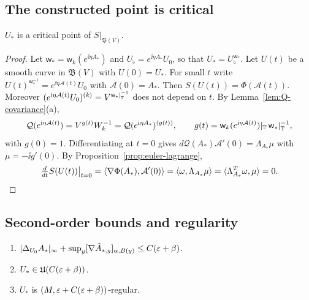 \subsection{The constructed point is critical}

\begin{proposition}\label{prop:critical}
$U_*$ is a critical point of $S|_{\mathfrak B(V)}$.
\end{proposition}

\begin{proof}
Let $\mathsf w_*=\mathsf w_k(e^{\ii\eta A_*})$ and $U_\flat=e^{\ii\eta A_*}U_0$, so that $U_*=U_\flat^{\mathsf w_*}$. Let $U(t)$ be a smooth curve in $\mathfrak B(V)$ with $U(0)=U_*$. For small $t$ write $U(t)^{\mathsf w_*^{-1}}=e^{\ii\eta\mathcal A(t)}U_0$ with $\mathcal A(0)=A_*$. Then $S(U(t))=\Phi(\mathcal A(t))$. Moreover $(e^{\mathrm i\eta\mathcal A(t)}U_0)^{(k)}=V^{\mathsf w_*|_\mathbb T^{-1}}$ does not depend on $t$. By Lemma~\ref{lem:Q-covariance}(a),
\[
\mathcal Q(e^{\mathrm i\eta\mathcal A(t)})=V^{g(t)}W_k^{-1}=\mathcal Q(e^{\mathrm i\eta A_*})^{(g(t))},\qquad g(t)=\mathsf w_k(e^{\mathrm i\eta\mathcal A(t)})|_\mathbb T\,\mathsf w_*|_\mathbb T^{-1},
\]
with $g(0)=1$. Differentiating at $t=0$ gives $d\mathcal Q(A_*)\mathcal A'(0)=\Lambda_{A_*}\mu$ with $\mu=-\ii g'(0)$. By Proposition~\ref{prop:euler-lagrange},
\[
\tfrac{d}{dt}S(U(t))\big|_{t=0}=\langle \nabla\Phi(A_*),\mathcal A'(0)\rangle=\langle \omega,\Lambda_{A_*}\mu\rangle=\langle \Lambda_{A_*}^T\omega,\mu\rangle=0.\qedhere
\]
\end{proof}

\subsection{Second-order bounds and regularity}

\begin{proposition}\label{prop:minimizer-regularity}
\begin{enumerate}[label=(\alph*)]
\item $|\Delta_{U_0}A_*|_\infty+\sup_y[\nabla\tilde A_{*,y}]_{\alpha,B(y)}\le C(\varepsilon+\beta)$.
\item $U_*\in\mathfrak U(C(\varepsilon+\beta))$.
\item $U_*$ is $(M,\varepsilon+C(\varepsilon+\beta))$-regular.
\end{enumerate}
\end{proposition}

